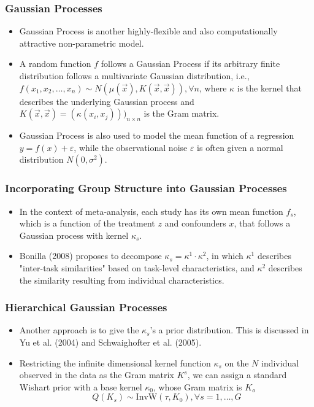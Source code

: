 \documentclass[xetex,mathserif,serif]{beamer}
\begin{document}
\begin{frame}
  \frametitle{Gaussian Processes}
  \begin{itemize}
  \item Gaussian Process is another highly-flexible and also computationally
    attractive non-parametric model.
  \item A random function $f$ follows a Gaussian Process if its arbitrary finite
    distribution follows a multivariate Gaussian distribution, i.e.,
    $f(x_1,x_2,\ldots,x_n)\sim N(\mu(\vec x), K(\vec x, \vec x)), \forall n$,
    where $\kappa$ is the kernel that describes the underlying Gaussian process
    and $K(\vec x, \vec x)=(\kappa(x_i, x_j)))_{n\times n}$ is the Gram matrix.
  \item Gaussian Process is also used to model the mean function of a regression
    $y=f(x)+\varepsilon$, while the observational noise $\varepsilon$ is often
    given a normal distribution $N(0, \sigma^2)$.
  \end{itemize}
\end{frame}

\begin{frame}
  \frametitle{Incorporating Group Structure into Gaussian Processes}
  \begin{itemize}
  \item In the context of meta-analysis, each study has its own mean function
    $f_s$, which is a function of the treatment $z$ and confounders $x$, that
    follows a Gaussian process with kernel $\kappa_s$.
  \item Bonilla (2008) proposes to decompose $\kappa_s=\kappa^1\cdot\kappa^2$, in
    which $\kappa^1$ describes "inter-task similarities" based on task-level
    characteristics, and $\kappa^2$ describes the similarity resulting from
    individual characteristics.
  \end{itemize}
\end{frame}

\begin{frame}
  \frametitle{Hierarchical Gaussian Processes}
  \begin{itemize}
  \item Another approach is to give the $\kappa_s$'s a prior distribution. This
    is discussed in Yu et al. (2004) and Schwaighofter et al. (2005).
  \item Restricting the infinite dimensional kernel function $\kappa_s$ on the
    $N$ individual observed in the data as the Gram matrix $K^s$, we can assign a
    standard Wishart prior with a base kernel $\kappa_0$, whose Gram matrix is $K_o$
    \[Q(K_s)\sim \text{InvW}(\tau, K_0), \forall s=1,\ldots,G\]
  \end{itemize}
\end{frame}
\end{document}
